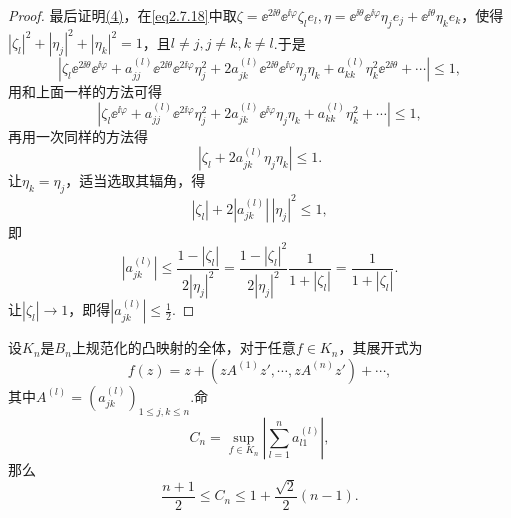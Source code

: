 \begin{proof}
最后证明\hyperlink{2.7.4}{(4)}，在\eqref{eq2.7.18}中取$\zeta=\ee^{2\ii\theta}\ee^{\ii\varphi}\zeta_l e_l,\eta=\ee^{\ii\theta}\ee^{\ii\varphi}\eta_j e_j+\ee^{\ii\theta}\eta_k e_k$，使得$|\zeta_l|^2+|\eta_j|^2+|\eta_k|^2=1$，且$l\neq j,j\neq k,k\neq l$.于是
\[|\zeta_l \ee^{2\ii\theta}\ee^{\ii\varphi}+a_{jj}^{(l)}\ee^{2\ii\theta}\ee^{2\ii\varphi}\eta_j^2+2a_{jk}^{(l)}\ee^{2\ii\theta}\ee^{\ii\varphi}\eta_j\eta_k+a_{kk}^{(l)}\eta_k^2\ee^{2\ii\theta}+\cdots|\le1,\]
用和上面一样的方法可得
\[|\zeta_l\ee^{\ii\varphi}+a_{jj}^{(l)}\ee^{2\ii\varphi}\eta_j^2+2a_{jk}^{(l)}\ee^{\ii\varphi}\eta_j\eta_k+a_{kk}^{(l)}\eta_k^2+\cdots|\le1,\]
再用一次同样的方法得
\[|\zeta_l+2a_{jk}^{(l)}\eta_j\eta_k|\le1.\]
让$\eta_k=\eta_j$，适当选取其辐角，得
\[|\zeta_l|+2|a_{jk}^{(l)}|\,|\eta_j|^2\le1,\]
即
\[|a_{jk}^{(l)}|\le\frac{1-|\zeta_l|}{2|\eta_j|^2}=\frac{1-|\zeta_l|^2}{2|\eta_j|^2}\frac1{1+|\zeta_l|}=\frac1{1+|\zeta_l|}.\]
让$|\zeta_l|\to1$，即得$|a_{jk}^{(l)}|\le\frac12$.
\end{proof}
\begin{lemma}\label{lem2.7.5}
	设$K_n$是$B_n$上规范化的凸映射的全体，对于任意$f\in K_n$，其展开式为
	\[f(z)=z+(zA^{(1)}z',\cdots,zA^{(n)}z')+\cdots,\]
	其中$A^{(l)}=(a_{jk}^{(l)})_{1\le j,k\le n}$.命
	\begin{equation}\label{eq2.7.21}
		C_n=\sup_{f\in K_n}\left|\sum_{l=1}^{n}a_{l1}^{(l)}\right|,
	\end{equation}
那么
\begin{equation}\label{eq2.7.22}
	\frac{n+1}{2}\le C_n\le1+\frac{\sqrt{2}}{2}(n-1).
\end{equation}
\end{lemma}

